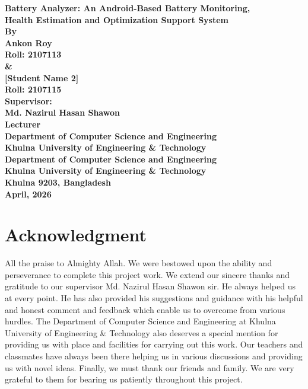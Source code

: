 \documentclass[12pt,a4paper]{report}
\begin{document}
\thispagestyle{plain}
\setcounter{page}{1}
\begin{center}
  \Large\bfseries Battery Analyzer: An Android-Based Battery Monitoring,\\
  Health Estimation and Optimization Support System\\[36pt]
  \normalsize By\\[24pt]
  \large\bfseries Ankon Roy\\
  \normalsize Roll: 2107113\\[6pt]
  \large \&\\[6pt]
  \large\bfseries [Student Name 2]\\
  \normalsize Roll: 2107115\\[48pt]
  \textbf{Supervisor:}\\[4pt]
  \large\bfseries Md. Nazirul Hasan Shawon\\[4pt]
  \normalsize Lecturer\\[4pt]
  Department of Computer Science and Engineering\\
  Khulna University of Engineering \& Technology\\[48pt]
  \normalsize
  Department of Computer Science and Engineering\\
  Khulna University of Engineering \& Technology\\
  Khulna 9203, Bangladesh\\[6pt]
  \large\bfseries April, 2026
\end{center}
\clearpage

\chapter*{Acknowledgment}

All the praise to Almighty Allah. We were bestowed upon the ability and perseverance to complete this project work.
We extend our sincere thanks and gratitude to our supervisor Md. Nazirul Hasan Shawon sir. He always helped us at every point. He has also provided his suggestions and guidance with his helpful and honest comment and feedback which enable us to overcome from various hurdles.
The Department of Computer Science and Engineering at Khulna University of Engineering & Technology also deserves a special mention for providing us with place and facilities for carrying out this work. Our teachers and classmates have always been there helping us in various discussions and providing us with novel ideas.
Finally, we must thank our friends and family. We are very grateful to them for bearing us patiently throughout this project.
\end{document}
